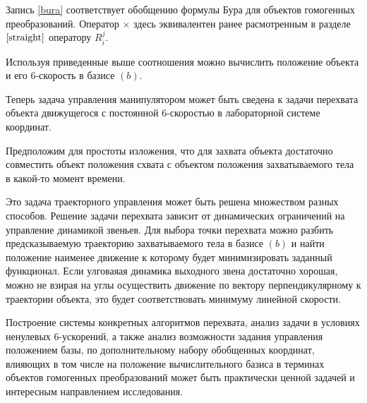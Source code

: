 Запись \ref{bura} соответствует обобщению формулы Бура для объектов гомогенных преобразований. Оператор $\times$ здесь эквивалентен ранее расмотренным в разделе $\ref{straight}$ оператору $R^j_i$.

Используя приведенные выше соотношения можно вычислить положение объекта и его 6-скорость в базисе $(b)$. 

Теперь задача управления манипулятором может быть сведена к задачи перехвата объекта движущегося с постоянной 6-скоростью в лабораторной системе координат. 

Предположим для простоты изложения, что для захвата объекта достаточно совместить объект положения схвата с объектом положения захватываемого тела в какой-то момент времени.

Это задача траекторного управления может быть решена множеством разных способов. Решение задачи перехвата зависит от динамических ограничений на управление динамикой звеньев. Для выбора точки перехвата можно разбить предсказываемую траекторию захватываемого тела в базисе $(b)$ и найти положение наименее движение к которому будет минимизировать заданный функционал. Если улговаяая динамика выходного звена достаточно хорошая, можно не взирая на углы осуществить движение по вектору перпендикулярному к траектории объекта, это будет соответствовать минимуму линейной скорости.

Построение системы конкретных алгоритмов перехвата, анализ задачи в условиях ненулевых 6-ускорений, а также анализ возможности задания управления положением базы, по дополнительному набору обобщенных координат, влияющих в том числе на положение вычислительного базиса в терминах объектов гомогенных преобразований может быть практически ценной задачей и интересным направлением исследования.